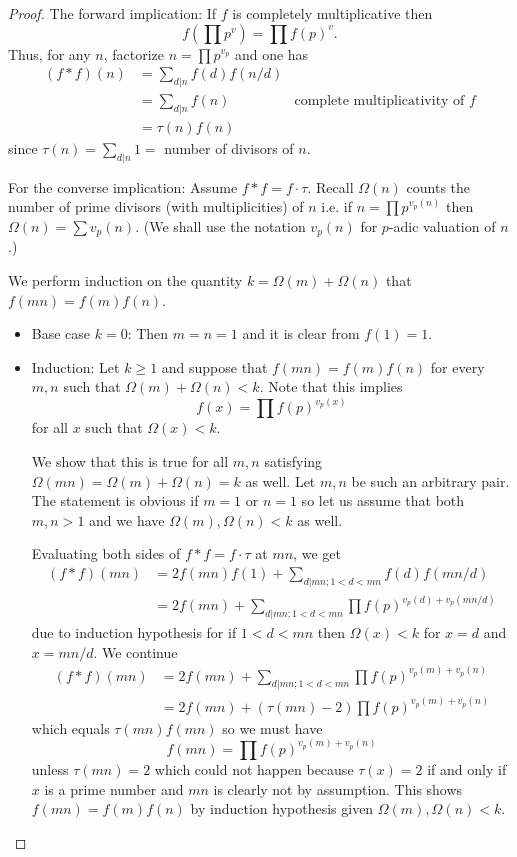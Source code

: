 \documentclass{article}
\begin{document}
\begin{proof}
The forward implication: If $f$ is completely multiplicative then
$$f(\prod p^v) = \prod f(p)^v.$$
Thus, for any $n$, factorize $n = \prod p^{v_p}$ and one has
\begin{align*}
(f * f)(n) &= \sum_{d | n} f(d) f(n/d)\\
&= \sum_{d | n} f(n) &\text{complete multiplicativity of } f\\
&= \tau(n) f(n)
\end{align*}
since $\tau(n) = \sum_{d | n} 1 = $ number of divisors of $n$.

For the converse implication: Assume $f * f = f \cdot \tau$. Recall $\Omega(n)$ counts the number of prime divisors (with multiplicities) of $n$ i.e. if $n = \prod p^{v_p(n)}$ then $\Omega(n) = \sum v_p(n)$. (We shall use the notation $v_p(n)$ for $p$-adic valuation of $n$.)

We perform induction on the quantity $k = \Omega(m) + \Omega(n)$ that $f(mn) = f(m) f(n)$.

\begin{itemize}
\item Base case $k = 0$: Then $m = n = 1$ and it is clear from $f(1) = 1$.

\item Induction: Let $k \geq 1$ and suppose that $f(m n) = f(m) f(n)$ for every $m, n$ such that $\Omega(m) + \Omega(n) < k$. Note that this implies
$$f(x) = \prod f(p)^{v_p(x)}$$
for all $x$ such that $\Omega(x) < k$.

We show that this is true for all $m, n$ satisfying $\Omega(mn) = \Omega(m) + \Omega(n) = k$ as well. Let $m, n$ be such an arbitrary pair. The statement is obvious if $m = 1$ or $n = 1$ so let us assume that both $m, n > 1$ and we have $\Omega(m), \Omega(n) < k$ as well.

Evaluating both sides of $f * f = f \cdot \tau$ at $mn$, we get
\begin{align*}
(f * f)(mn) &= 2 f(mn) f(1) + \sum_{d | mn; 1 < d < mn} f(d) f(mn/d)\\
&= 2 f(mn) + \sum_{d | mn; 1 < d < mn} \prod f(p)^{v_p(d) + v_p(mn/d)}
\end{align*}
due to induction hypothesis for if $1 < d < mn$ then $\Omega(x) < k$ for $x = d$ and $x = mn/d$. We continue
\begin{align*}
(f * f)(mn) &= 2 f(mn) + \sum_{d | mn; 1 < d < mn} \prod f(p)^{v_p(m) + v_p(n)}\\
&= 2 f(mn) + (\tau(mn) - 2) \prod f(p)^{v_p(m) + v_p(n)}
\end{align*}
which equals $\tau(mn) f(mn)$ so we must have
$$f(mn) = \prod f(p)^{v_p(m) + v_p(n)}$$
unless $\tau(mn) = 2$ which could not happen because $\tau(x) = 2$ if and only if $x$ is a prime number and $mn$ is clearly not by assumption. This shows $f(mn) = f(m) f(n)$ by induction hypothesis given $\Omega(m), \Omega(n) < k$.
\end{itemize}
\end{proof}
\end{document}
